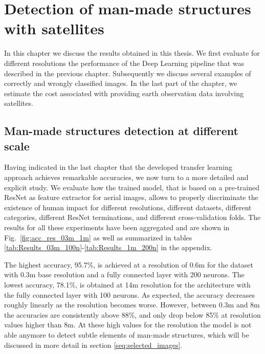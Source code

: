 
\chapter{Detection of man-made structures with satellites} 

\label{Chapter5}


In this chapter we discuss the results obtained in this thesis. We first evaluate for different resolutions the performance of the Deep Learning pipeline that was described in the previous chapter. Subsequently we discuss several examples of correctly and wrongly classified images. In the last part of the chapter, we estimate the cost associated with providing earth observation data involving satellites.

\section{Man-made structures detection at different scale}

Having indicated in the last chapter that the developed transfer learning approach achieves remarkable accuracies, we now turn to a more detailed and explicit study. We evaluate how the trained model, that is based on a pre-trained ResNet as feature extractor for aerial images, allows to properly discriminate the existence of human impact for different resolutions, different datasets, different categories, different ResNet terminations, and different cross-validation folds. The results for all these experiments have been aggregated and are shown in Fig.~\ref{fig:acc_res_03m_1m} as well as summarized in tables \ref{tab:Results_03m_100n}-\ref{tab:Results_1m_200n} in the appendix. 

The highest accuracy, 95.7\%, is achieved at a resolution of 0.6m for the dataset with 0.3m base resolution and a fully connected layer with 200 neurons. The lowest accuracy, 78.1\%, is obtained at 14m resolution for the architecture with the fully connected layer with 100 neurons. As expected, the accuracy decreases roughly linearly as the resolution becomes worse. However, between 0.3m and 8m the accuracies are consistently above 88\%, and only drop below 85\% at resolution values higher than 8m. At these high values for the resolution the model is not able anymore to detect subtle elements of man-made structures, which will be discussed in more detail in section \ref{seq:selected_images}.

